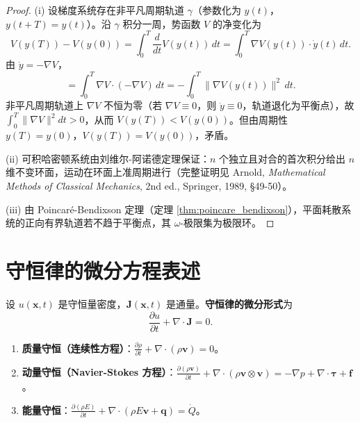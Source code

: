 \begin{proof}
(i) 设梯度系统存在非平凡周期轨道 $\gamma$（参数化为 $y(t)$，$y(t+T) = y(t)$）。沿 $\gamma$ 积分一周，势函数 $V$ 的净变化为
\[
V(y(T)) - V(y(0)) = \int_0^T \frac{d}{dt}V(y(t))\,dt = \int_0^T \nabla V(y(t)) \cdot \dot{y}(t)\,dt.
\]
由 $\dot{y} = -\nabla V$，
\[
= \int_0^T \nabla V \cdot (-\nabla V)\,dt = -\int_0^T \|\nabla V(y(t))\|^2\,dt.
\]
非平凡周期轨道上 $\nabla V$ 不恒为零（若 $\nabla V \equiv 0$，则 $\dot{y} \equiv 0$，轨道退化为平衡点），故 $\int_0^T \|\nabla V\|^2 dt > 0$，从而 $V(y(T)) < V(y(0))$。但由周期性 $y(T) = y(0)$，$V(y(T)) = V(y(0))$，矛盾。

(ii) 可积哈密顿系统由刘维尔-阿诺德定理保证：$n$ 个独立且对合的首次积分给出 $n$ 维不变环面，运动在环面上准周期进行（完整证明见 Arnold, \textit{Mathematical Methods of Classical Mechanics}, 2nd ed., Springer, 1989, \S{}49-50）。

(iii) 由 Poincaré-Bendixson 定理（定理 \ref{thm:poincare_bendixson}），平面耗散系统的正向有界轨道若不趋于平衡点，其 $\omega$-极限集为极限环。
\end{proof}

\section{守恒律的微分方程表述}\label{sec:conservation_laws_pde}

\begin{definition}[守恒律的微分形式]\label{def:conservation_law_differential}
设 $u(\mathbf{x}, t)$ 是守恒量密度，$\mathbf{J}(\mathbf{x}, t)$ 是通量。\textbf{守恒律的微分形式}为
\[
\frac{\partial u}{\partial t} + \nabla \cdot \mathbf{J} = 0.
\]
\end{definition}

\begin{example}[三类经典守恒律]\label{ex:three_conservation_laws}
\begin{enumerate}[label=(\roman*)]
    \item \textbf{质量守恒（连续性方程）}：$\frac{\partial \rho}{\partial t} + \nabla \cdot (\rho \mathbf{v}) = 0$。
    \item \textbf{动量守恒（Navier-Stokes 方程）}：$\frac{\partial (\rho \mathbf{v})}{\partial t} + \nabla \cdot (\rho \mathbf{v} \otimes \mathbf{v}) = -\nabla p + \nabla \cdot \boldsymbol{\tau} + \mathbf{f}$。
    \item \textbf{能量守恒}：$\frac{\partial (\rho E)}{\partial t} + \nabla \cdot (\rho E \mathbf{v} + \mathbf{q}) = \dot{Q}$。
\end{enumerate}
\end{example}

